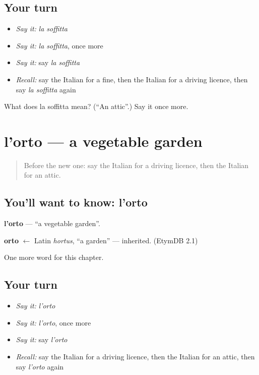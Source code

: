 \subsection*{Your turn}
\begin{itemize}
\raggedright
  \item \emph{Say it:} \emph{la soffitta}
  \item \emph{Say it:} \emph{la soffitta}, once more
  \item \emph{Say it:} say \emph{la soffitta}
  \item \emph{Recall:} say the Italian for a fine, then the Italian for a driving licence, then say \emph{la soffitta} again
\end{itemize}

\begin{tcolorbox}[breakable,colback=teal!4,colframe=teal!35!black,title={Before you move on}]
What does la soffitta mean? (\textquotedblleft{}An attic\textquotedblright{}.) Say it once more.
\end{tcolorbox}
\section[l'orto]{l'orto — a vegetable garden}

\label{lesson:IT-C168-orto}



\begin{quote}
Before the new one: say the Italian for a driving licence, then the Italian for an attic.
\end{quote}

\subsection*{You'll want to know: l'orto}
\textbf{l'orto} — \textquotedblleft{}a vegetable garden\textquotedblright{}.

\begin{cousinweb}
\textbf{orto} $\leftarrow$ Latin \emph{hortus}, \textquotedblleft{}a garden\textquotedblright{} — inherited. (EtymDB 2.1)
\end{cousinweb}

\begin{grammarlens}[title={What you've built}]
One more word for this chapter.
\end{grammarlens}

\subsection*{Your turn}
\begin{itemize}
\raggedright
  \item \emph{Say it:} \emph{l'orto}
  \item \emph{Say it:} \emph{l'orto}, once more
  \item \emph{Say it:} say \emph{l'orto}
  \item \emph{Recall:} say the Italian for a driving licence, then the Italian for an attic, then say \emph{l'orto} again
\end{itemize}

